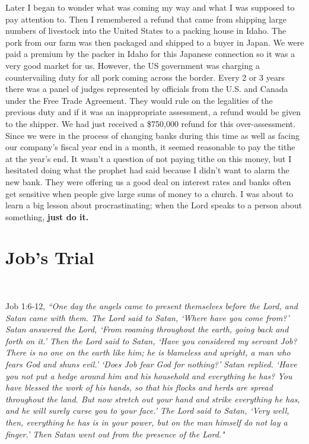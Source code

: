 \documentclass[oneside]{book}
\begin{document}
Later I began to wonder what was coming my way and what I was supposed to pay attention to. Then I remembered a refund that came from shipping large numbers of livestock into the United States to a packing house in Idaho. The pork from our farm was then packaged and shipped to a buyer in Japan. We were paid a premium by the packer in Idaho for this Japanese connection so it was a very good market for us. However, the US government was charging a countervailing duty for all pork coming across the border. Every 2 or 3 years there was a panel of judges represented by officials from the U.S. and Canada under the Free Trade Agreement. They would rule on the legalities of the previous duty and if it was an inappropriate assessment, a refund would be given to the shipper. We had just received a \$750,000 refund for this over-assessment. Since we were in the process of changing banks during this time as well as facing our company's fiscal year end in a month, it seemed reasonable to pay the tithe at the year's end. It wasn't a question of not paying tithe on this money, but I hesitated doing what the prophet had said because I didn't want to alarm the new bank. They were offering us a good deal on interest rates and banks often get sensitive when people give large sums of money to a church. I was about to learn a big lesson about procrastinating; when the Lord speaks to a person about something, \textbf{just do it.}


\section{Job's Trial}
\

Job 1:6-12, \textit{``One day the angels came to present themselves before the Lord, and Satan came with them. The Lord said to Satan, `Where have you come from?' Satan answered the Lord, `From roaming throughout the earth, going back and forth on it.' Then the Lord said to Satan, `Have you considered my servant Job? There is no one on the earth like him; he is blameless and upright, a man who fears God and shuns evil.' `Does Job fear God for nothing?' Satan replied. `Have you not put a hedge around him and his household and everything he has? You have blessed the work of his hands, so that his flocks and herds are spread throughout the land. But now stretch out your hand and strike everything he has, and he will surely curse you to your face.' The Lord said to Satan, `Very well, then, everything he has is in your power, but on the man himself do not lay a finger.' Then Satan went out from the presence of the Lord."}
\end{document}
